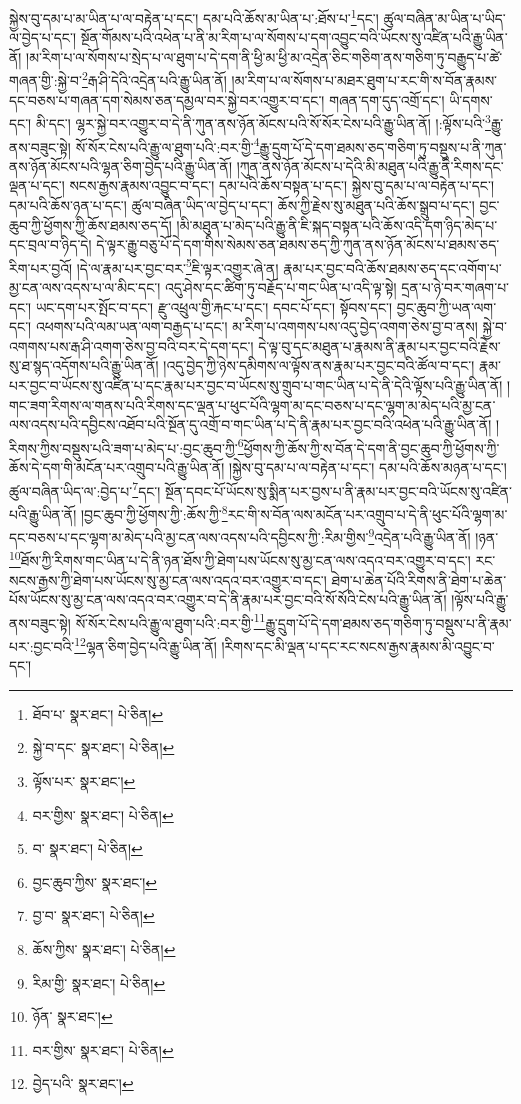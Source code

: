 སྐྱེས་བུ་དམ་པ་མ་ཡིན་པ་ལ་བརྟེན་པ་དང་། དམ་པའི་ཆོས་མ་ཡིན་པ་:ཐོས་པ་\footnote{ཐོབ་པ་  སྣར་ཐང་།  པེ་ཅིན། }དང་། ཚུལ་བཞིན་མ་ཡིན་པ་ཡིད་ལ་བྱེད་པ་དང་། སྔོན་གོམས་པའི་འཕེན་པ་ནི་མ་རིག་པ་ལ་སོགས་པ་དག་འབྱུང་བའི་ཡོངས་སུ་འཛིན་པའི་རྒྱུ་ཡིན་ནོ། །མ་རིག་པ་ལ་སོགས་པ་སྲེད་པ་ལ་ཐུག་པ་དེ་དག་ནི་ཕྱི་མ་ཕྱི་མ་འདྲེན་ཅིང་གཅིག་ནས་གཅིག་ཏུ་བརྒྱུད་པ་ཚེ་གཞན་གྱི་:སྐྱེ་བ་\footnote{སྐྱེ་བ་དང་  སྣར་ཐང་།  པེ་ཅིན། }རྒ་ཤི་དེའི་འདྲེན་པའི་རྒྱུ་ཡིན་ནོ། །མ་རིག་པ་ལ་སོགས་པ་མཐར་ཐུག་པ་རང་གི་ས་བོན་རྣམས་དང་བཅས་པ་གཞན་དག་སེམས་ཅན་དམྱལ་བར་སྐྱེ་བར་འགྱུར་བ་དང་། གཞན་དག་དུད་འགྲོ་དང་། ཡི་དགས་དང་། མི་དང་། ལྷར་སྐྱེ་བར་འགྱུར་བ་དེ་ནི་ཀུན་ནས་ཉོན་མོངས་པའི་སོ་སོར་ངེས་པའི་རྒྱུ་ཡིན་ནོ། །:ལྟོས་པའི་\footnote{ལྟོས་པར་  སྣར་ཐང་། }རྒྱུ་ནས་བཟུང་སྟེ། སོ་སོར་ངེས་པའི་རྒྱུ་ལ་ཐུག་པའི་:བར་གྱི་\footnote{བར་གྱིས་  སྣར་ཐང་།  པེ་ཅིན། }རྒྱུ་དྲུག་པོ་དེ་དག་ཐམས་ཅད་གཅིག་ཏུ་བསྡུས་པ་ནི་ཀུན་ནས་ཉོན་མོངས་པའི་ལྷན་ཅིག་བྱེད་པའི་རྒྱུ་ཡིན་ནོ། །ཀུན་ནས་ཉོན་མོངས་པ་དེའི་མི་མཐུན་པའི་རྒྱུ་ནི་རིགས་དང་ལྡན་པ་དང་། སངས་རྒྱས་རྣམས་འབྱུང་བ་དང་། དམ་པའི་ཆོས་བསྟན་པ་དང་། སྐྱེས་བུ་དམ་པ་ལ་བརྟེན་པ་དང་། དམ་པའི་ཆོས་ཉན་པ་དང་། ཚུལ་བཞིན་ཡིད་ལ་བྱེད་པ་དང་། ཆོས་ཀྱི་རྗེས་སུ་མཐུན་པའི་ཆོས་སྒྲུབ་པ་དང་། བྱང་ཆུབ་ཀྱི་ཕྱོགས་ཀྱི་ཆོས་ཐམས་ཅད་དོ། །མི་མཐུན་པ་མེད་པའི་རྒྱུ་ནི་ཇི་སྐད་བསྟན་པའི་ཆོས་འདི་དག་ཉིད་མེད་པ་དང་བྲལ་བ་ཉིད་དེ། དེ་ལྟར་རྒྱུ་བཅུ་པོ་དེ་དག་གིས་སེམས་ཅན་ཐམས་ཅད་ཀྱི་ཀུན་ནས་ཉོན་མོངས་པ་ཐམས་ཅད་རིག་པར་བྱའོ། །དེ་ལ་རྣམ་པར་བྱང་བར་\footnote{བ་  སྣར་ཐང་།  པེ་ཅིན། }ཇི་ལྟར་འགྱུར་ཞེ་ན། རྣམ་པར་བྱང་བའི་ཆོས་ཐམས་ཅད་དང་འགོག་པ་མྱ་ངན་ལས་འདས་པ་ལ་མིང་དང་། འདུ་ཤེས་དང་ཚིག་ཏུ་བརྗོད་པ་གང་ཡིན་པ་འདི་ལྟ་སྟེ། དྲན་པ་ཉེ་བར་གཞག་པ་དང་། ཡང་དག་པར་སྤོང་བ་དང་། རྫུ་འཕྲུལ་གྱི་རྐང་པ་དང་། དབང་པོ་དང་། སྟོབས་དང་། བྱང་ཆུབ་ཀྱི་ཡན་ལག་དང་། འཕགས་པའི་ལམ་ཡན་ལག་བརྒྱད་པ་དང་། མ་རིག་པ་འགགས་པས་འདུ་བྱེད་འགག་ཅེས་བྱ་བ་ནས། སྐྱེ་བ་འགགས་པས་རྒ་ཤི་འགག་ཅེས་བྱ་བའི་བར་དེ་དག་དང་། དེ་ལྟ་བུ་དང་མཐུན་པ་རྣམས་ནི་རྣམ་པར་བྱང་བའི་རྗེས་སུ་ཐ་སྙད་འདོགས་པའི་རྒྱུ་ཡིན་ནོ། །འདུ་བྱེད་ཀྱི་ཉེས་དམིགས་ལ་ལྟོས་ནས་རྣམ་པར་བྱང་བའི་ཚོལ་བ་དང་། རྣམ་པར་བྱང་བ་ཡོངས་སུ་འཛིན་པ་དང་རྣམ་པར་བྱང་བ་ཡོངས་སུ་གྲུབ་པ་གང་ཡིན་པ་དེ་ནི་དེའི་ལྟོས་པའི་རྒྱུ་ཡིན་ནོ། །གང་ཟག་རིགས་ལ་གནས་པའི་རིགས་དང་ལྡན་པ་ཕུང་པོའི་ལྷག་མ་དང་བཅས་པ་དང་ལྷག་མ་མེད་པའི་མྱ་ངན་ལས་འདས་པའི་དབྱིངས་འཐོབ་པའི་སྔོན་དུ་འགྲོ་བ་གང་ཡིན་པ་དེ་ནི་རྣམ་པར་བྱང་བའི་འཕེན་པའི་རྒྱུ་ཡིན་ནོ། །རིགས་ཀྱིས་བསྡུས་པའི་ཟག་པ་མེད་པ་:བྱང་ཆུབ་ཀྱི་\footnote{བྱང་ཆུབ་ཀྱིས་  སྣར་ཐང་། }ཕྱོགས་ཀྱི་ཆོས་ཀྱི་ས་བོན་དེ་དག་ནི་བྱང་ཆུབ་ཀྱི་ཕྱོགས་ཀྱི་ཆོས་དེ་དག་གི་མངོན་པར་འགྲུབ་པའི་རྒྱུ་ཡིན་ནོ། །སྐྱེས་བུ་དམ་པ་ལ་བརྟེན་པ་དང་། དམ་པའི་ཆོས་མཉན་པ་དང་། ཚུལ་བཞིན་ཡིད་ལ་:བྱེད་པ་\footnote{བྱ་བ་  སྣར་ཐང་།  པེ་ཅིན། }དང་། སྔོན་དབང་པོ་ཡོངས་སུ་སྨིན་པར་བྱས་པ་ནི་རྣམ་པར་བྱང་བའི་ཡོངས་སུ་འཛིན་པའི་རྒྱུ་ཡིན་ནོ། །བྱང་ཆུབ་ཀྱི་ཕྱོགས་ཀྱི་:ཆོས་ཀྱི་\footnote{ཆོས་ཀྱིས་  སྣར་ཐང་།  པེ་ཅིན། }རང་གི་ས་བོན་ལས་མངོན་པར་འགྲུབ་པ་དེ་ནི་ཕུང་པོའི་ལྷག་མ་དང་བཅས་པ་དང་ལྷག་མ་མེད་པའི་མྱ་ངན་ལས་འདས་པའི་དབྱིངས་ཀྱི་:རིམ་གྱིས་\footnote{རིམ་གྱི་  སྣར་ཐང་།  པེ་ཅིན། }འདྲེན་པའི་རྒྱུ་ཡིན་ནོ། །ཉན་\footnote{ཉོན་  སྣར་ཐང་། }ཐོས་ཀྱི་རིགས་གང་ཡིན་པ་དེ་ནི་ཉན་ཐོས་ཀྱི་ཐེག་པས་ཡོངས་སུ་མྱ་ངན་ལས་འདའ་བར་འགྱུར་བ་དང་། རང་སངས་རྒྱས་ཀྱི་ཐེག་པས་ཡོངས་སུ་མྱ་ངན་ལས་འདའ་བར་འགྱུར་བ་དང་། ཐེག་པ་ཆེན་པོའི་རིགས་ནི་ཐེག་པ་ཆེན་པོས་ཡོངས་སུ་མྱ་ངན་ལས་འདའ་བར་འགྱུར་བ་དེ་ནི་རྣམ་པར་བྱང་བའི་སོ་སོའི་ངེས་པའི་རྒྱུ་ཡིན་ནོ། །ལྟོས་པའི་རྒྱུ་ནས་བཟུང་སྟེ། སོ་སོར་ངེས་པའི་རྒྱུ་ལ་ཐུག་པའི་:བར་གྱི་\footnote{བར་གྱིས་  སྣར་ཐང་།  པེ་ཅིན། }རྒྱུ་དྲུག་པོ་དེ་དག་ཐམས་ཅད་གཅིག་ཏུ་བསྡུས་པ་ནི་རྣམ་པར་:བྱང་བའི་\footnote{བྱེད་པའི་  སྣར་ཐང་། }ལྷན་ཅིག་བྱེད་པའི་རྒྱུ་ཡིན་ནོ། །རིགས་དང་མི་ལྡན་པ་དང་རང་སངས་རྒྱས་རྣམས་མི་འབྱུང་བ་དང་། 